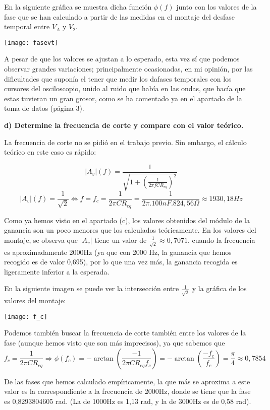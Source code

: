 \documentclass{article}
\begin{document}
En la siguiente gráfica se muestra dicha función $\phi (f)$ junto con los valores de la fase que se han calculado a partir de las medidas en el montaje del desfase temporal entre $V_A$ y $V_2$.

\begin{center}
\texttt{[image: fasevt]}
\end{center}

A pesar de que los valores se ajustan a lo esperado, esta vez sí que podemos observar grandes variaciones; principalmente ocasionadas, en mi opinión, por las dificultades que suponía el tener que medir los dafases temporales con los cursores del osciloscopio, unido al ruido que había en las ondas, que hacía que estas tuvieran un gran grosor, como se ha comentado ya en  el apartado de la toma de datos (página 3). 

\bigskip

\textbf{d) Determine la frecuencia de corte y compare con el valor teórico.}

La frecuencia de corte no se pidió en el trabajo previo. Sin embargo, el cálculo teórico en este caso es rápido:

$$|A_v|(f)=\frac{1}{\sqrt{1+\left(\frac{1}{2\pi f C R_{eq}}\right)^2}}$$
\bigskip
$$|A_v|(f)=\frac{1}{\sqrt 2} \iff f=f_c=\frac{1}{2\pi C R_{eq}} = \frac{1}{2\pi . 100 nF .824,56\Omega} \approx 1930,18 Hz$$
\bigskip

Como ya hemos visto en el apartado (c), los valores obtenidos del módulo de la ganancia son un poco menores que los calculados teóricamente. En los valores del montaje, se observa que $|A_v|$ tiene un valor de $\frac{1}{\sqrt 2}\approx 0,7071$, cuando la frecuencia es aproximadamente 2000Hz (ya que con 2000 Hz, la ganancia que hemos recogido es de valor 0,695), por lo que una vez más, la ganancia recogida es ligeramente inferior a la esperada. 

En la siguiente imagen se puede ver la intersección entre $\frac{1}{\sqrt 2}$ y la gráfica de los valores del montaje:

\begin{center}
\texttt{[image: f\_c]}
\end{center}

Podemos también buscar la frecuencia de corte también entre los valores de la fase (aunque hemos visto que son más imprecisos), ya que sabemos que 
$$f_c=  \frac{1}{2\pi C R_{eq}} \Longrightarrow \phi (f_c) = - \arctan\left(\frac{-1}{2\pi C R_{eq} f_c}\right) = -\arctan \left(\frac{-f_c}{f_c}\right) = \frac{\pi}{4} \approx 0,7854$$

De las fases que hemos calculado empíricamente, la que más se aproxima a este valor es la correspondiente a la frecuencia de 2000Hz, donde se tiene que la fase es 0,8293804605 rad. (La de 1000Hz es 1,13 rad, y la de 3000Hz es de 0,58 rad).
\end{document}
